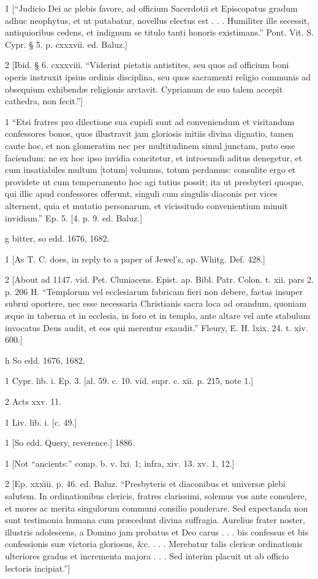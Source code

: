 1
[“Judicio Dei ac plebis favore, ad officium Sacerdotii et Episcopatus gradum adhuc neophytus, et ut putabatur, novellus electus est . . . Humiliter ille secessit, antiquioribus cedens, et indignum se titulo tanti honoris existimans.” Pont. Vit. S. Cypr. § 5. p. cxxxvii. ed. Baluz.]

2
[Ibid. § 6. cxxxviii. “Viderint pietatis antistites, seu quos ad officium boni operis instruxit ipsius ordinis disciplina, seu quos sacramenti religio communis ad obsequium exhibendæ religionis arctavit. Cyprianum de suo talem accepit cathedra, non fecit.”]

1
“Etsi fratres pro dilectione sua cupidi sunt ad conveniendum et visitandum confessores bonos, quos illustravit jam gloriosis initiis divina dignatio, tamen caute hoc, et non glomeratim nec per multitudinem simul junctam, puto esse faciendum: ne ex hoc ipso invidia concitetur, et introeundi aditus denegetur, et cum insatiabiles multum [totum] volumus, totum perdamus: consulite ergo et providete ut cum temperamento hoc agi tutius possit; ita ut presbyteri quoque, qui illic apud confessores offerunt, singuli cum singulis diaconis per vices alternent, quia et mutatio personarum, et vicissitudo convenientium minuit invidiam.” Ep. 5. [4. p. 9. ed. Baluz.]

g
bitter, so edd. 1676, 1682.

1
[As T. C. does, in reply to a paper of Jewel’s, ap. Whitg. Def. 428.]

2
[About ad 1147. vid. Pet. Cluniacens. Epist. ap. Bibl. Patr. Colon. t. xii. pars 2. p. 206 H. “Templorum vel ecclesiarum fabricam fieri non debere, factas insuper subrui oportere, nec esse necessaria Christianis sacra loca ad orandum, quoniam æque in taberna et in ecclesia, in foro et in templo, ante altare vel ante stabulum invocatus Deus audit, et eos qui merentur exaudit.” Fleury, E. H. lxix. 24. t. xiv. 600.]

h
So edd. 1676, 1682.

1
Cypr. lib. i. Ep. 3. [al. 59. c. 10. vid. supr. c. xii. p. 215, note 1.]

2
Acts xxv. 11.

1
Liv. lib. i. [c. 49.]

1
[So edd. Query, reverence.] 1886.

1
[Not “ancients:” comp. b. v. lxi. 1; infra, xiv. 13. xv. 1, 12.]

2
[Ep. xxxiii. p. 46. ed. Baluz. “Presbyteris et diaconibus et universæ plebi salutem. In ordinationibus clericis, fratres clarissimi, solemus vos ante consulere, et mores ac merita singulorum communi consilio ponderare. Sed expectanda non sunt testimonia humana cum præcedunt divina suffragia. Aurelius frater noster, illustris adolescens, a Domino jam probatus et Deo carus . . . bis confessus et bis confessionis suæ victoria gloriosus, &c. . . . Merebatur talis clericæ ordinationis ulteriores gradus et incrementa majora . . . Sed interim placuit ut ab officio lectoris incipiat.”]

